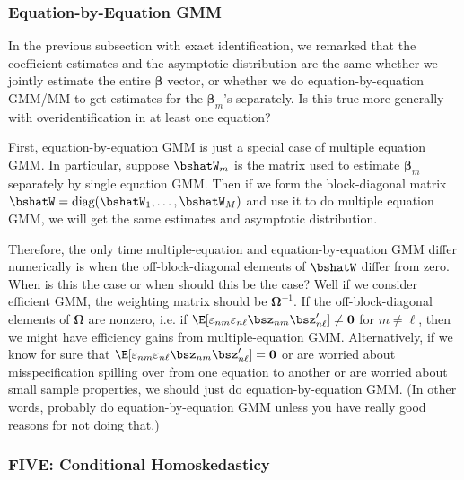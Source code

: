 \documentclass[12pt]{article}
\theoremstyle{plain}
\theoremstyle{definition}
\theoremstyle{remark}
\newcommand{\diag}{\text{diag}}
\newcommand{\bsbeta}{\boldsymbol{\beta}}
\newcommand{\bsOmega}{\boldsymbol{\Omega}}
\renewcommand{\bso}{\boldsymbol{0}}
\begin{document}
\subsubsection{Equation-by-Equation GMM}

In the previous subsection with exact identification, we remarked that
the coefficient estimates and the asymptotic distribution are the same
whether we jointly estimate the entire $\bsbeta$ vector, or whether we
do equation-by-equation GMM/MM to get estimates for the $\bsbeta_m$'s
separately. Is this true more generally with overidentification in at
least one equation?

First, equation-by-equation GMM is just a special case of multiple
equation GMM. In particular, suppose $\bshatW_m$ is the matrix used to
estimate $\bsbeta_m$ separately by single equation GMM.  Then if we form
the block-diagonal matrix $\bshatW=\diag(\bshatW_1,\ldots,\bshatW_M)$
and use it to do multiple equation GMM, we will get the same estimates
and asymptotic distribution.

Therefore, the only time multiple-equation and equation-by-equation GMM
differ numerically is when the off-block-diagonal elements of $\bshatW$
differ from zero. When is this the case or when should this be the case?
Well if we consider efficient GMM, the weighting matrix should be
$\bsOmega^{-1}$. If the off-block-diagonal elements of $\bsOmega$ are
nonzero, i.e. if
$\E[\varepsilon_{nm}\varepsilon_{n\ell}\bsz_{nm}\bsz_{n\ell}']\neq\bso$
for $m\neq\ell$, then we might have efficiency gains from
multiple-equation GMM. Alternatively, if we know for sure that
$\E[\varepsilon_{nm}\varepsilon_{n\ell}\bsz_{nm}\bsz_{n\ell}']=\bso$
or are worried about misspecification spilling over from one equation to
another or are worried about small sample properties, we should just do
equation-by-equation GMM. (In other words, probably do
equation-by-equation GMM unless you have really good reasons for not
doing that.)

\subsubsection{FIVE: Conditional Homoskedasticy}
\end{document}
